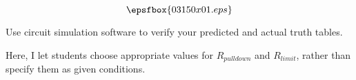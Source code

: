 

$$\epsfbox{03150x01.eps}$$

\vfil \eject






Use circuit simulation software to verify your predicted and actual truth tables.







Here, I let students choose appropriate values for $R_{pulldown}$ and $R_{limit}$, rather than specify them as given conditions.




